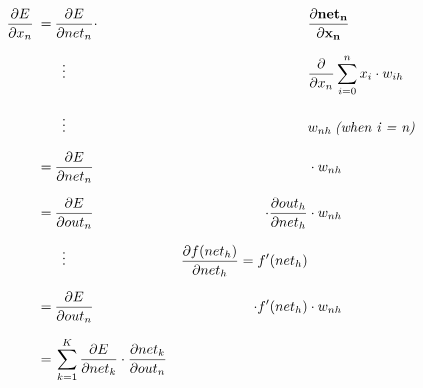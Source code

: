 \documentclass[12pt]{article}
\begin{document}
\begin{equation}
    \begin{aligned}
        \frac{\partial E}{\partial x_{n}} \:=\: & \frac{\partial E}{\partial net_{n}} \cdot                                                            &                                                              & \mathbf{ \frac{\partial net_{n}}{\partial x_{n}} }               \\[0.68em]
                                                & \mathrel{\makebox[\widthof{=}]{\vdots}}                                                              &                                                              & \frac{\partial}{\partial x_{n}} \sum_{i=0}^{n}x_{i} \cdot w_{ih} \\[0.68em]
                                                & \mathrel{\makebox[\widthof{=}]{\vdots}}                                                              &                                                              & w_{nh} \: \textit{(when i = n)}                                  \\[0.68em]
                                          \:=\: & \frac{\partial E}{\partial net_{n}}                                                                  &                                                              & \cdot w_{nh}                                                     \\[0.68em]
                                          \:=\: & \frac{\partial E}{\partial out_{n}}                                                                  & \cdot \frac{\partial out_{h}}{\partial net_{h}}              & \cdot w_{nh}                                                     \\[0.68em]
                                                & \mathrel{\makebox[\widthof{=}]{\vdots}}                                                              & \frac{\partial f(net_{h})}{\partial net_{h}} = f'(net_{h})   &                                                                  \\[0.68em]
                                          \:=\: & \frac{\partial E}{\partial out_{n}}                                                                  & \cdot f'(net_{h})                                            & \cdot w_{nh}                                                     \\[0.68em]
                                          \:=\: & \sum_{k=1}^{K} \frac{\partial E}{\partial net_{k}} \cdot \frac{\partial net_{k}}{\partial out_{n}}   &                                                              &                                                                  \\[0.68em]

\end{aligned}
\end{equation}
\end{document}
